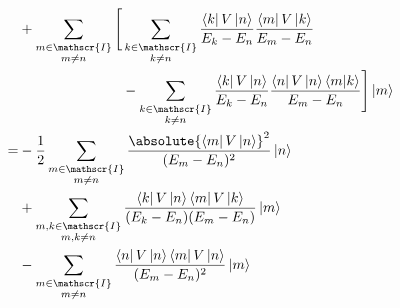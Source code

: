 \documentclass[10pt,fleqn]{article}
\newcommand{\bra}[1]{\left\langle #1 \right\vert}
\newcommand{\ket}[1]{\left\vert #1 \right\rangle}
\newcommand{\bracket}[2]{\left\langle #1 \middle\vert #2 \right\rangle}
\begin{document}
\begin{multicols}{2}
\[\begin{aligned}
          &+ \sum_{\substack{m\in\mathscr{I}\\m\neq n}} \Bigg[
            \begin{aligned}[t]
              & \sum_{\substack{k\in\mathscr{I} \\ k\neq n}} \frac{\bra{k}V\ket{n}}{E_k-E_n} \frac{\bra{m}V\ket{k}}{E_m-E_n}  \\
              & - \sum_{\substack{k\in\mathscr{I} \\ k\neq n}} \frac{\bra{k}V\ket{n}}{E_k-E_n} \frac{\bra{n}V\ket{n} \bracket{m}{k}}{E_m - E_n} \Bigg] \ket{m}
            \end{aligned}
          \\
          = &-\frac{1}{2} \sum_{\substack{m\in\mathscr{I}\\m\neq n}} \frac{\absolute{\bra{m}V\ket{n}}^2}{(E_m-E_n)^2} \ket{n} \\
          &+ \sum_{\substack{m,k\in\mathscr{I}\\m,k\neq n}} \frac{\bra{k}V\ket{n} \bra{m}V\ket{k}}{(E_k-E_n)(E_m-E_n)} \ket{m} \\
          &- \sum_{\substack{m\in\mathscr{I}\\m\neq n}} \frac{\bra{n}V\ket{n} \bra{m}V\ket{n}}{(E_m-E_n)^2} \ket{m}
        \end{aligned}
      \]


\end{multicols}
\end{document}

